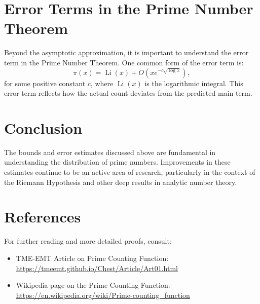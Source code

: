 \section{Error Terms in the Prime Number Theorem}
Beyond the asymptotic approximation, it is important to understand the error term in the Prime Number Theorem. One common form of the error term is:
\[
\pi(x) = \operatorname{Li}(x) + O\left(x e^{-c\sqrt{\log x}}\right),
\]
for some positive constant \(c\), where $\operatorname{Li}(x)$ is the logarithmic integral. This error term reflects how the actual count deviates from the predicted main term.

\section{Conclusion}
The bounds and error estimates discussed above are fundamental in understanding the distribution of prime numbers. Improvements in these estimates continue to be an active area of research, particularly in the context of the Riemann Hypothesis and other deep results in analytic number theory.

\section{References}
For further reading and more detailed proofs, consult:
\begin{itemize}
    \item TME-EMT Article on Prime Counting Function: \url{https://tmeemt.github.io/Chest/Article/Art01.html}
    \item Wikipedia page on the Prime Counting Function: \url{https://en.wikipedia.org/wiki/Prime-counting_function}
\end{itemize}

